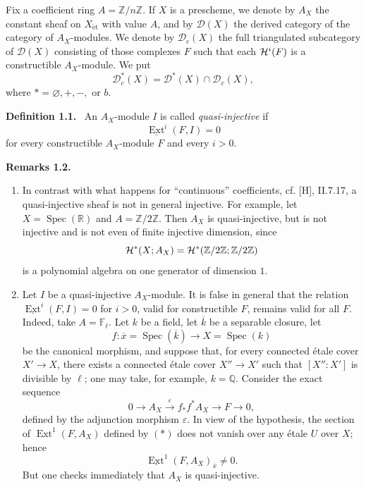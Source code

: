 \documentclass[11pt]{article}
\theoremstyle{plain}
\theoremstyle{definition}
\theoremstyle{remark}
\newenvironment{statement}[1]{\par\medskip\noindent\textbf{#1.}\ }{\par\medskip}
\newcommand{\FF}{\mathbb F}
\newcommand{\RR}{\mathbb R}
\newcommand{\ZZ}{\mathbb Z}
\newcommand{\D}{\mathcal D}\newcommand{\E}{\mathcal E}\newcommand{\F}{\mathcal F}
\DeclareMathOperator{\Spec}{Spec}
\DeclareMathOperator{\Ext}{Ext}
\newcommand{\ol}[1]{\overline{#1}}
\begin{document}
Fix a coefficient ring $A=\ZZ/n\ZZ$. If $X$ is a prescheme, we denote by $A_X$ the constant sheaf on $X_{\mathrm{\acute et}}$ with value $A$, and by $\D(X)$ the derived category of the category of $A_X$-modules. We denote by $\D_c(X)$ the full triangulated subcategory of $\D(X)$ consisting of those complexes $F$ such that each $\mathcal H^i(F)$ is a constructible $A_X$-module. We put
\[
   \D_c^{*}(X)=\D^{*}(X)\cap\D_c(X),
\]
where $*=\varnothing,+,-,$ or $b$.

\begin{statement}{Definition 1.1}
An $A_X$-module $I$ is called \emph{quasi-injective} if
\[
   \underline{\Ext}^{i}(F,I)=0
\]
for every constructible $A_X$-module $F$ and every $i>0$.
\end{statement}

\begin{statement}{Remarks 1.2}
\begin{enumerate}[label=\alph*)]
\item In contrast with what happens for ``continuous'' coefficients, cf. [H], II.7.17, a quasi-injective sheaf is not in general injective. For example, let $X=\Spec(\RR)$ and $A=\ZZ/2\ZZ$. Then $A_X$ is quasi-injective, but is not injective and is not even of finite injective dimension, since
\[
   \Hh^*(X;A_X)=\Hh^*(\ZZ/2\ZZ;\ZZ/2\ZZ)
\]
is a polynomial algebra on one generator of dimension $1$.

\item Let $I$ be a quasi-injective $A_X$-module. It is false in general that the relation $\underline{\Ext}^i(F,I)=0$ for $i>0$, valid for constructible $F$, remains valid for all $F$. Indeed, take $A=\FF_\ell$. Let $k$ be a field, let $\ol{k}$ be a separable closure, let
\[
   f:\ol{x}=\Spec(\ol{k})\longrightarrow X=\Spec(k)
\]
be the canonical morphism, and suppose that, for every connected étale cover $X'\to X$, there exists a connected étale cover $X''\to X'$ such that $[X'':X']$ is divisible by $\ell$; one may take, for example, $k=\mathbb Q$. Consider the exact sequence
\[
   0\longrightarrow A_X \xrightarrow{\,\varepsilon\,} f_*f^*A_X\longrightarrow F\longrightarrow0,
   \tag{*}
\]
defined by the adjunction morphism $\varepsilon$. In view of the hypothesis, the section of $\Ext^1(F,A_X)$ defined by $(*)$ does not vanish over any étale $U$ over $X$; hence
\[
   \underline{\Ext}^1(F,A_X)_{\ol{x}}\ne0.
\]
But one checks immediately that $A_X$ is quasi-injective.
\end{enumerate}
\end{statement}
\end{document}
